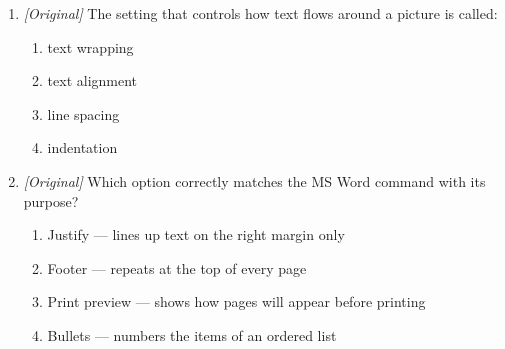 \documentclass[11pt]{article}
\begin{document}
\begin{enumerate}[label=\textbf{Q\arabic*.}, leftmargin=*]
\begin{enumerate}[label=\Alph*.]
    \item Section Break
    \item Line Break
    \item Column Break
  \end{enumerate}
\item \textit{[Original]} The setting that controls how text flows around a
  picture is called:
  \begin{enumerate}[label=\Alph*.]
    \item text wrapping
    \item text alignment
    \item line spacing
    \item indentation
  \end{enumerate}
\item \textit{[Original]} Which option correctly matches the MS Word command
  with its purpose?
  \begin{enumerate}[label=\Alph*.]
    \item Justify --- lines up text on the right margin only
    \item Footer --- repeats at the top of every page
    \item Print preview --- shows how pages will appear before printing
    \item Bullets --- numbers the items of an ordered list
  \end{enumerate}


\end{enumerate}
\end{document}
